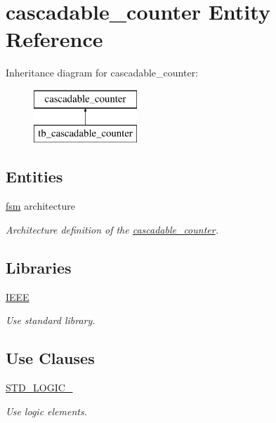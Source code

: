 \hypertarget{classcascadable__counter}{}\section{cascadable\+\_\+counter Entity Reference}
\label{classcascadable__counter}
Inheritance diagram for cascadable\+\_\+counter\+:\begin{figure}[H]
\begin{center}
\leavevmode
\includegraphics[height=2.000000cm]{classcascadable__counter}
\end{center}
\end{figure}
\subsection*{Entities}
\begin{DoxyCompactItemize}
\item 
\hyperlink{classcascadable__counter_1_1fsm}{fsm} architecture
\begin{DoxyCompactList}\small\item\em Architecture definition of the \hyperlink{classcascadable__counter}{cascadable\+\_\+counter}. \end{DoxyCompactList}\end{DoxyCompactItemize}
\subsection*{Libraries}
 \begin{DoxyCompactItemize}
\item 
\hyperlink{classcascadable__counter_ae4f03c286607f3181e16b9aa12d0c6d4}{I\+E\+EE} \hypertarget{classcascadable__counter_ae4f03c286607f3181e16b9aa12d0c6d4}{}\label{classcascadable__counter_ae4f03c286607f3181e16b9aa12d0c6d4}

\begin{DoxyCompactList}\small\item\em Use standard library. \end{DoxyCompactList}\end{DoxyCompactItemize}
\subsection*{Use Clauses}
 \begin{DoxyCompactItemize}
\item 
\hyperlink{classcascadable__counter_aa4b2b25246a821511120e3149b003563}{S\+T\+D\+\_\+\+L\+O\+G\+I\+C\+\_}   \hypertarget{classcascadable__counter_aa4b2b25246a821511120e3149b003563}{}\label{classcascadable__counter_aa4b2b25246a821511120e3149b003563}

\begin{DoxyCompactList}\small\item\em Use logic elements. \end{DoxyCompactList}\end{DoxyCompactItemize}
